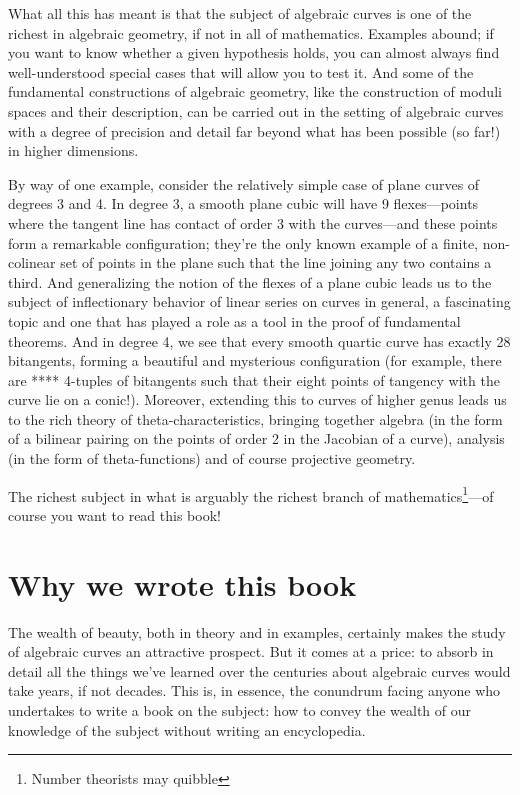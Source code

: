 What all this has meant is that the subject of algebraic curves is one of the richest in algebraic geometry, if not in all of mathematics. Examples abound; if you want to know whether a given hypothesis holds, you can almost always find well-understood special cases that will allow you to test it. And some of the fundamental constructions of algebraic geometry, like the construction of moduli spaces and their description, can be carried out in the setting of algebraic curves with a degree of precision and detail far beyond what has been possible (so far!) in higher dimensions. 

By way of one example, consider the relatively simple case of plane curves of degrees 3 and 4. In degree 3, a smooth plane cubic will have 9 flexes---points where the tangent line has contact of order 3 with the curves---and these points form a remarkable configuration; they're the only known example of a finite, non-colinear set of points in the plane such that the line joining any two contains a third. And generalizing the notion of the flexes of a plane cubic leads us to the subject of inflectionary behavior of linear series on curves in general, a fascinating topic and one that has played a role as a tool in the proof of fundamental theorems. And in degree 4, we see that every smooth quartic curve has exactly 28 bitangents, forming a beautiful and mysterious configuration (for example, there are **** 4-tuples of bitangents such that their eight points of tangency with the curve lie on a conic!). Moreover, extending this to curves of higher genus leads us to the rich theory of theta-characteristics, bringing together algebra (in the form of a bilinear pairing on the points of order 2 in the Jacobian of a curve), analysis (in the form of theta-functions) and of course projective geometry.

The richest subject in what is arguably the richest branch of mathematics\footnote{Number theorists may quibble}---of course you want to read this book! 

\section{Why we wrote this book}

The wealth of beauty, both in theory and in examples, certainly makes the study of algebraic curves an attractive prospect. But it comes at a price: to absorb in detail all the things we've learned over the centuries about algebraic curves would take years, if not decades. This is, in essence, the conundrum facing anyone who undertakes to write a book on the subject: how to convey the wealth of our knowledge of the subject without writing an encyclopedia.

